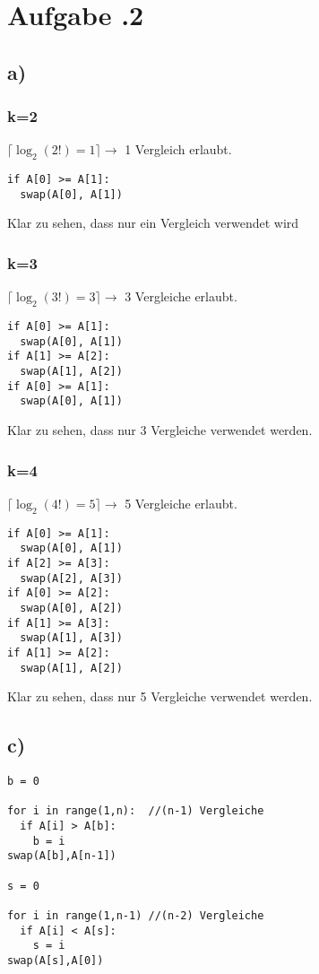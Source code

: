 \newpage
\section*{Aufgabe \bn.2}
\subsection*{a)}
\subsubsection*{k=2}
$ \lceil\log_{2}(2!) = 1\rceil \rightarrow $ 1 Vergleich erlaubt.
\begin{Verbatim}[frame=single]
if A[0] >= A[1]:
  swap(A[0], A[1])
\end{Verbatim}
Klar zu sehen, dass nur ein Vergleich verwendet wird
\subsubsection*{k=3}
$ \lceil\log_{2}(3!) = 3\rceil \rightarrow $ 3 Vergleiche erlaubt.
\begin{Verbatim}[frame=single]
if A[0] >= A[1]:
  swap(A[0], A[1])
if A[1] >= A[2]:
  swap(A[1], A[2])
if A[0] >= A[1]:
  swap(A[0], A[1])
\end{Verbatim}
Klar zu sehen, dass nur 3 Vergleiche verwendet werden.
\subsubsection*{k=4}
$ \lceil\log_{2}(4!) = 5\rceil \rightarrow $ 5 Vergleiche erlaubt.
\begin{Verbatim}[frame=single]
if A[0] >= A[1]:
  swap(A[0], A[1])
if A[2] >= A[3]:
  swap(A[2], A[3])
if A[0] >= A[2]:
  swap(A[0], A[2])
if A[1] >= A[3]:
  swap(A[1], A[3])
if A[1] >= A[2]:
  swap(A[1], A[2])
\end{Verbatim}
Klar zu sehen, dass nur 5 Vergleiche verwendet werden.
\subsection*{c)}
\begin{Verbatim}[frame=single]
b = 0

for i in range(1,n):  //(n-1) Vergleiche
  if A[i] > A[b]:
    b = i
swap(A[b],A[n-1])

s = 0

for i in range(1,n-1) //(n-2) Vergleiche
  if A[i] < A[s]:
    s = i
swap(A[s],A[0])
\end{Verbatim}
